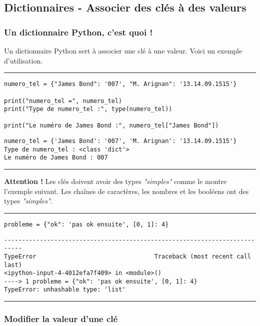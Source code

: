 \subsection{Dictionnaires - Associer des clés à des valeurs}

\subsubsection{Un dictionnaire Python, c'est quoi !}

Un dictionnaire Python sert à associer une clé à une valeur. Voici un exemple d'utilisation.


\bigskip
{\hrule height .5mm}
\begin{verbatim}
numero_tel = {"James Bond": '007', "M. Arignan": '13.14.09.1515'}

print("numero_tel =", numero_tel)
print("Type de numero_tel :", type(numero_tel))

print("Le numéro de James Bond :", numero_tel["James Bond"])
\end{verbatim}
 \color{ForestGreen}
\vspace{-1.5em}
\begin{verbatim}
numero_tel = {'James Bond': '007', 'M. Arignan': '13.14.09.1515'}
Type de numero_tel : <class 'dict'>
Le numéro de James Bond : 007
\end{verbatim} \color{Black}
{\hrule height .5mm}
\bigskip


\textbf{Attention !} Les clés doivent avoir des types \textit{"simples"} comme le montre l'exemple suivant. Les chaînes de caractères, les nombres et les booléens ont des types \textit{"simples"}.


\bigskip
{\hrule height .5mm}
\begin{verbatim}
probleme = {"ok": 'pas ok ensuite', [0, 1]: 4}
\end{verbatim}
 \color{ForestGreen}
\vspace{-1.5em}
\begin{verbatim}
---------------------------------------------------------------------------
TypeError                                 Traceback (most recent call last)
<ipython-input-4-4012efa7f409> in <module>()
----> 1 probleme = {"ok": 'pas ok ensuite', [0, 1]: 4}
TypeError: unhashable type: 'list'
\end{verbatim} \color{Black}
{\hrule height .5mm}
\bigskip


\subsubsection{Modifier la valeur d'une clé}

